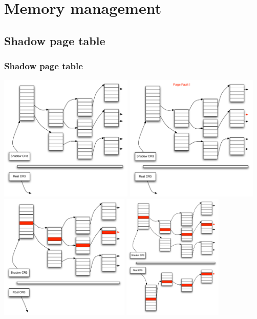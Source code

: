 \section{Memory management}
\subsection{Shadow page table}
\begin{frame}
\frametitle{Shadow page table}
\begin{overlayarea}{10cm}{10cm}
 {\includegraphics[height=6cm]{pic/shadow_page_table_1}}
 {\includegraphics[height=6cm]{pic/shadow_page_table_2}}
 {\includegraphics[height=6cm]{pic/shadow_page_table_3}}
 {\includegraphics[height=6cm]{pic/shadow_page_table_4}}

\end{overlayarea}
\end{frame}
